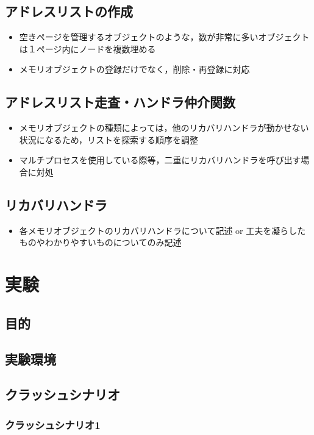 \documentclass[10.5ptj,a4j]{ltjsarticle}
\providecommand{\tightlist}{%
  \setlength{\itemsep}{0pt}\setlength{\parskip}{0pt}}
\begin{document}
\subsection{アドレスリストの作成}
\begin{itemize}\tightlist{}
  \item 空きページを管理するオブジェクトのような，数が非常に多いオブジェクトは１ページ内にノードを複数埋める
  \item メモリオブジェクトの登録だけでなく，削除・再登録に対応
\end{itemize}

\subsection{アドレスリスト走査・ハンドラ仲介関数}
\begin{itemize}\tightlist{}
\item メモリオブジェクトの種類によっては，他のリカバリハンドラが動かせない状況になるため，リストを探索する順序を調整
\item マルチプロセスを使用している際等，二重にリカバリハンドラを呼び出す場合に対処
\end{itemize}

\subsection{リカバリハンドラ}
\begin{itemize}\tightlist{}
\item 各メモリオブジェクトのリカバリハンドラについて記述 or 工夫を凝らしたものやわかりやすいものについてのみ記述
\end{itemize}

\section{実験}
\subsection{目的}
\subsection{実験環境}
\subsection{クラッシュシナリオ}
\subsubsection{クラッシュシナリオ1}
\end{document}
